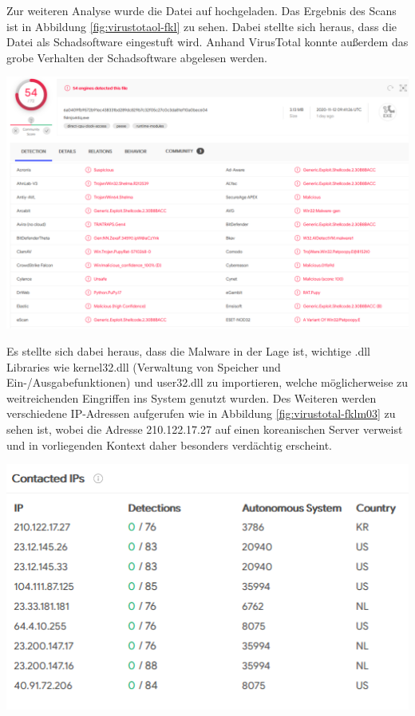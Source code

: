 Zur weiteren Analyse wurde die Datei auf  hochgeladen.
Das Ergebnis des Scans ist in Abbildung \ref{fig:virustotaol-fkl} zu sehen.
Dabei stellte sich heraus, dass die Datei als Schadsoftware eingestuft wird. Anhand VirusTotal konnte außerdem das grobe Verhalten der Schadsoftware abgelesen werden.
\begin{center}
	\includegraphics[width=15.8cm]{figures/virustotaol-fklm.PNG}
	\label{fig:virustotaol-fkl}
\end{center}

\newpage
Es stellte sich dabei heraus, dass die Malware in der Lage ist, wichtige .dll Libraries wie kernel32.dll (Verwaltung von Speicher und  Ein-/Ausgabefunktionen) und user32.dll zu importieren, welche möglicherweise zu weitreichenden Eingriffen ins System genutzt wurden.
Des Weiteren werden verschiedene IP-Adressen aufgerufen wie in Abbildung \ref{fig:virustotal-fklm03} zu sehen ist, wobei die Adresse 210.122.17.27 auf einen koreanischen Server verweist und in vorliegenden Kontext daher besonders verdächtig erscheint.

\begin{center}
	\includegraphics[width=15.8cm]{figures/virustotal-fklm03.PNG}
	\label{fig:virustotal-fklm03}
\end{center}

